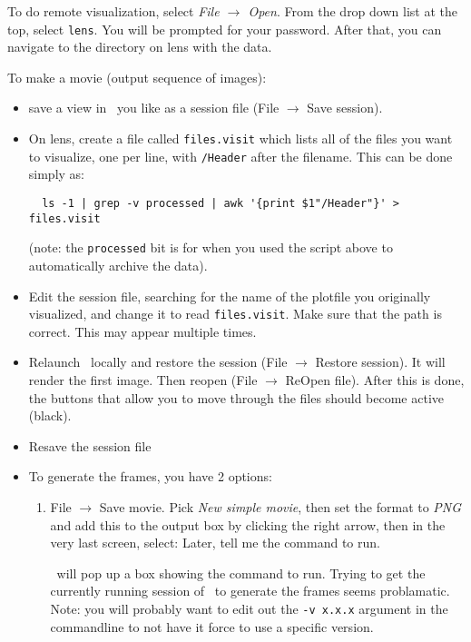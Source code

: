 To do remote visualization, select {\em File $\rightarrow$ Open}.
From the drop down list at the top, select {\tt lens}.  You will be
prompted for your password.  After that, you can navigate to the
directory on lens with the data.

To make a movie (output sequence of images):
\begin{itemize}
\item save a view in \visit\ you like as a session file (File $\rightarrow$ Save session).  
\item On lens, create a file called {\tt files.visit} which lists all
  of the files you want to visualize, one per line, with {\tt /Header}
  after the filename.  This can be done simply as:
  \begin{verbatim}
  ls -1 | grep -v processed | awk '{print $1"/Header"}' > files.visit
  \end{verbatim}
  (note: the {\tt processed} bit is for when you used the script above to 
  automatically archive the data).

\item Edit the session file, searching for the name of the plotfile you
  originally visualized, and change it to read {\tt files.visit}.  Make
  sure that the path is correct.  This may appear multiple times.

\item Relaunch \visit\ locally and restore the session (File $\rightarrow$ Restore session).  It will render the first image.  Then reopen (File $\rightarrow$ ReOpen file).  After this is done, the buttons that allow you to move through the files should become active (black).

\item Resave the session file

\item To generate the frames, you have 2 options:

  \begin{enumerate}
  \item File $\rightarrow$ Save movie.  Pick {\em New simple movie},
    then set the format to {\em PNG} and add this to the output box by
    clicking the right arrow, then in the very last screen, select:
    {Later, tell me the command to run}.

   \visit\ will pop up a box showing the command to run.  Trying to
   get the currently running session of \visit\ to generate the frames
   seems problamatic.  Note: you will probably want to edit out the
   {\tt -v x.x.x} argument in the commandline to not have it force
   to use a specific version.


\end{enumerate}
\end{itemize}

